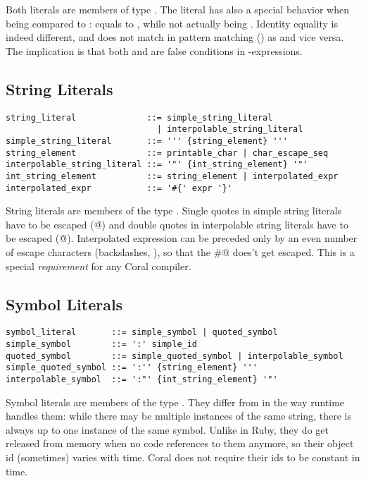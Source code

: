 Both literals are members of type \lstinline@Boolean@. The \lstinline@no@ literal has also a special behavior when being compared to \lstinline@nil@: \lstinline@no@ equals to \lstinline@nil@, while not actually being \lstinline@nil@. Identity equality is indeed different, and  does not match in pattern matching () as  and vice versa. The implication is that both \lstinline@nil@ and \lstinline@no@ are false conditions in \lstinline@if@-expressions. 

\subsection{String Literals}\label{sec:stringliterals}

\syntax\begin{lstlisting}
string_literal              ::= simple_string_literal 
                              | interpolable_string_literal
simple_string_literal       ::= ''' {string_element} '''
string_element              ::= printable_char | char_escape_seq
interpolable_string_literal ::= '"' {int_string_element} '"'
int_string_element          ::= string_element | interpolated_expr
interpolated_expr           ::= '#{' expr '}'
\end{lstlisting}

String literals are members of the type \lstinline@String@. Single quotes in simple string literals have to be escaped (\lstinline@\'@) and double quotes in interpolable string literals have to be escaped (\lstinline@\"@). Interpolated expression can be preceded only by an even number of escape characters (backslashes, \lstinline@\@), so that the \lstinline@#@ does't get escaped. This is a special \textit{requirement} for any Coral compiler. 

\subsection{Symbol Literals}\label{sec:symbolliterals}


\syntax\begin{lstlisting}
symbol_literal       ::= simple_symbol | quoted_symbol
simple_symbol        ::= ':' simple_id
quoted_symbol        ::= simple_quoted_symbol | interpolable_symbol
simple_quoted_symbol ::= ':'' {string_element} '''
interpolable_symbol  ::= ':"' {int_string_element} '"'
\end{lstlisting}

Symbol literals are members of the type \lstinline@Symbol@. They differ from  in the way runtime handles them: while there may be multiple instances of the same string, there is always up to one instance of the same symbol. Unlike in Ruby, they do get released from memory when no code references to them anymore, so their object id (sometimes) varies with time. Coral does not require their ids to be constant in time. 

